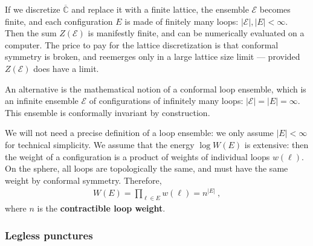 \documentclass[12pt, a4paper]{article}
\newcommand{\myindex}[1]{\textbf{\boldmath #1}}
\theoremstyle{break}
\begin{document}
If we discretize $\overline{\mathbb{C}}$ and replace it with a finite lattice, the ensemble $\mathcal{E}$ becomes finite, and each configuration $E$ is made of finitely many loops: $|\mathcal{E}|, |E|<\infty$. Then the sum $Z(\mathcal{E})$ is manifestly finite, and can be numerically evaluated on a computer. The price to pay for the lattice discretization is that conformal symmetry is broken, and reemerges only in a large lattice size limit --- provided $Z(\mathcal{E})$ does have a limit. 

An alternative is the mathematical notion of a conformal loop ensemble, which is an infinite ensemble $\mathcal{E}$ of configurations of infinitely many loops: $|\mathcal{E}|=|E|=\infty$. This ensemble is conformally invariant by construction. 

We will not need a precise definition of a loop ensemble: we only assume $|E|<\infty$ for technical simplicity. We assume that the energy $\log W(E)$ is extensive: then the weight of a configuration is a product of weights of individual loops $w(\ell)$. On the sphere, all loops are topologically the same, and must have the same weight by conformal symmetry. Therefore,
\begin{align}
 W(E) = \prod_{\ell \in E } w(\ell) = n^{|E|}\ ,
 \label{woe}
\end{align}
where $n$ is the \myindex{contractible loop weight}. 


\subsubsection{Legless punctures}
\end{document}
